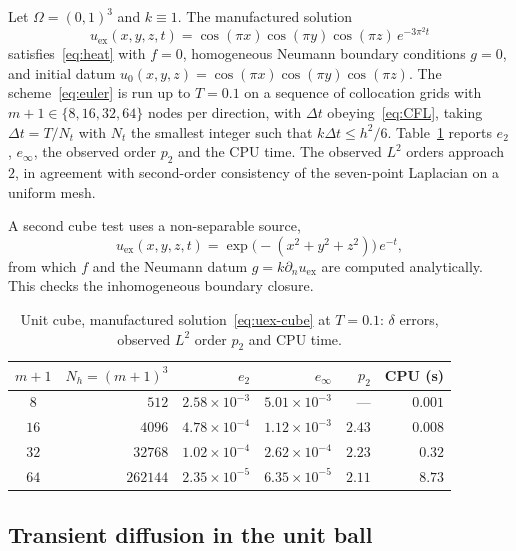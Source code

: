 \documentclass[final,3p,times]{elsarticle}
\theoremstyle{plain}
\theoremstyle{definition}
\theoremstyle{remark}
\newcommand{\dziti}{\ensuremath{\delta}\text{-Ziti}}
\begin{document}
Let $\Omega=(0,1)^3$ and $k\equiv 1$. The manufactured solution
\begin{equation}
\label{eq:uex-cube}
u_{\mathrm{ex}}(x,y,z,t)
=\cos(\pi x)\cos(\pi y)\cos(\pi z)\,e^{-3\pi^2 t}
\end{equation}
satisfies~\eqref{eq:heat} with $f=0$, homogeneous Neumann boundary conditions
$g=0$, and initial datum $u_0(x,y,z)=\cos(\pi x)\cos(\pi y)\cos(\pi z)$. The
scheme~\eqref{eq:euler} is run up to $T=0.1$ on a sequence of collocation
grids with $m+1\in\{8,16,32,64\}$ nodes per direction, with $\Delta t$
obeying~\eqref{eq:CFL}, taking $\Delta t=T/N_t$ with $N_t$ the smallest
integer such that $k\Delta t\le h^2/6$. Table~\ref{tab:cube} reports $e_2$,
$e_\infty$, the observed order $p_2$ and the CPU time. The observed $L^2$
orders approach $2$, in agreement with second-order consistency of the
seven-point Laplacian on a uniform mesh.

A second cube test uses a non-separable source,
\begin{equation}
\label{eq:uex-cube2}
u_{\mathrm{ex}}(x,y,z,t)
=\exp\bigl(-(x^2+y^2+z^2)\bigr)\,e^{-t},
\end{equation}
from which $f$ and the Neumann datum $g=k\partial_n u_{\mathrm{ex}}$ are
computed analytically. This checks the inhomogeneous boundary closure.

\begin{table}[htbp]
\centering
\caption{Unit cube, manufactured solution~\eqref{eq:uex-cube} at $T=0.1$:
\dziti{} errors, observed $L^2$ order $p_2$ and CPU time.}
\label{tab:cube}
\begin{tabular}{crrrrr}
\toprule
$m+1$ & $N_h=(m+1)^3$ & $e_2$ & $e_\infty$ & $p_2$ & CPU (s) \\
\midrule
$8$  & $512$     & $2.58\times 10^{-3}$ & $5.01\times 10^{-3}$ & ---   & $0.001$ \\
$16$ & $4096$    & $4.78\times 10^{-4}$ & $1.12\times 10^{-3}$ & $2.43$ & $0.008$ \\
$32$ & $32768$   & $1.02\times 10^{-4}$ & $2.62\times 10^{-4}$ & $2.23$ & $0.32$ \\
$64$ & $262144$  & $2.35\times 10^{-5}$ & $6.35\times 10^{-5}$ & $2.11$ & $8.73$ \\
\bottomrule
\end{tabular}
\end{table}

\subsection{Transient diffusion in the unit ball}
\label{sec:ball}
\end{document}
